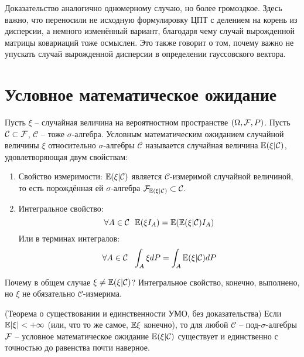 \begin{note}
    Доказательство аналогично одномерному случаю, но более громоздкое. Здесь важно, что переносили не исходную формулировку ЦПТ с делением на корень из дисперсии, а немного изменённый вариант, благодаря чему случай вырожденной матрицы ковариаций тоже осмыслен. Это также говорит о том, почему важно не упускать случай вырожденной дисперсии в определении гауссовского вектора.
\end{note}

\section{Условное математическое ожидание}

\begin{definition}
    Пусть $\xi$ -- случайная величина на вероятностном пространстве $(\Omega, \mathcal{F}, P)$. Пусть $\mathcal{C} \subset \mathcal{F}$, $\mathcal{C}$ -- тоже $\sigma$-алгебра. Условным математическим ожиданием случайной величины $\xi$ относительно $\sigma$-алгебры $\mathcal{C}$ называется случайная величина $\mathbb{E}(\xi | \mathcal{C})$, удовлетворяющая двум свойствам:
    \begin{enumerate}
        \item Свойство измеримости: $\mathbb{E}(\xi | \mathcal{C})$ является $\mathcal{C}$-измеримой случайной величиной, то есть порождённая ей $\sigma$-алгебра $\mathcal{F}_{\mathbb{E}(\xi | \mathcal{C})} \subset \mathcal{C}$.

        \item Интегральное свойство:
        \[
            \forall A \in \mathcal{C} \ \ \mathbb{E}(\xi I_A) = \mathbb{E}(\mathbb{E}(\xi | \mathcal{C}) I_A)
        \]
        Или в терминах интегралов:
        \[
            \forall A \in \mathcal{C} \ \ \int_A \xi dP = \int_A \mathbb{E}(\xi | \mathcal{C}) dP
        \]
    \end{enumerate}
\end{definition}

\begin{note}
    Почему в общем случае $\xi \neq \mathbb{E}(\xi | \mathcal{C})$? Интегральное свойство, конечно, выполнено, но $\xi$ не обязательно $\mathcal{C}$-измерима.
\end{note}

\begin{theorem} (Теорема о существовании и единственности УМО, без доказательства)
    Если $\mathbb{E}|\xi| < +\infty$ (или, что то же самое, $\mathbb{E}\xi$ конечно), то для любой $\mathcal{C}$ -- под-$\sigma$-алгебры $\mathcal{F}$ -- условное математическое ожидание $\mathbb{E}(\xi | \mathcal{C})$ существует и единственно с точностью до равенства почти наверное.
\end{theorem}

